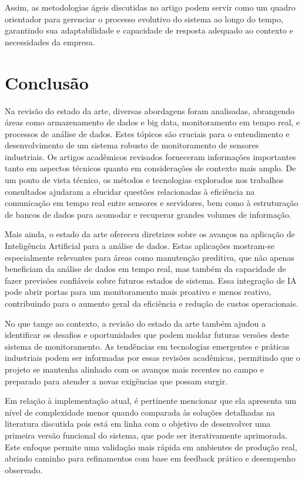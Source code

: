 Assim, as metodologias ágeis discutidas no artigo podem servir como um quadro orientador para gerenciar o processo evolutivo do sistema ao longo do tempo, garantindo sua adaptabilidade e capacidade de resposta adequado ao contexto e necessidades da empresa.


\section{Conclusão}
Na revisão do estado da arte, diversas abordagens foram analisadas, abrangendo áreas como armazenamento de dados e big data, monitoramento em tempo real, e processos de análise de dados. Estes tópicos são cruciais para o entendimento e desenvolvimento de um sistema robusto de monitoramento de sensores industriais. Os artigos acadêmicos revisados forneceram informações importantes tanto em aspectos técnicos quanto em considerações de contexto mais amplo. De um ponto de vista técnico, os métodos e tecnologias explorados nos trabalhos consultados ajudaram a elucidar questões relacionadas à eficiência na comunicação em tempo real entre sensores e servidores, bem como à estruturação de bancos de dados para acomodar e recuperar grandes volumes de informação.

Mais ainda, o estado da arte ofereceu diretrizes sobre os avanços na aplicação de Inteligência Artificial para a análise de dados. Estas aplicações mostram-se especialmente relevantes para áreas como manutenção preditiva, que não apenas beneficiam da análise de dados em tempo real, mas também da capacidade de fazer previsões confiáveis sobre futuros estados de sistema. Essa integração de IA pode abrir portas para um monitoramento mais proativo e menos reativo, contribuindo para o aumento geral da eficiência e redução de custos operacionais.

No que tange ao contexto, a revisão do estado da arte também ajudou a identificar os desafios e oportunidades que podem moldar futuras versões deste sistema de monitoramento. As tendências em tecnologias emergentes e práticas industriais podem ser informadas por essas revisões acadêmicas, permitindo que o projeto se mantenha alinhado com os avanços mais recentes no campo e preparado para atender a novas exigências que possam surgir.

Em relação à implementação atual, é pertinente mencionar que ela apresenta um nível de complexidade menor quando comparada às soluções detalhadas na literatura discutida pois está em linha com o objetivo de desenvolver uma primeira versão funcional do sistema, que pode ser iterativamente aprimorada. Este enfoque permite uma validação mais rápida em ambientes de produção real, abrindo caminho para refinamentos com base em feedback prático e desempenho observado.

